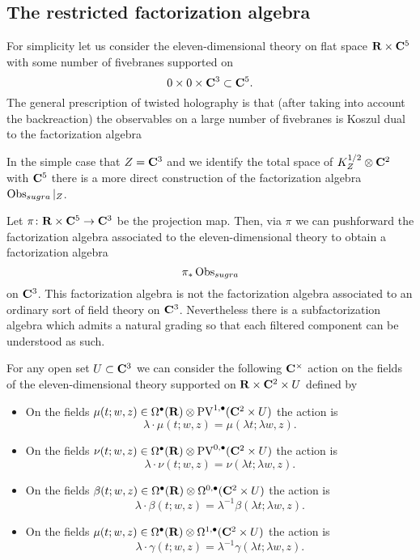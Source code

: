 \subsection{The restricted factorization algebra}

For simplicity let us consider the eleven-dimensional theory on flat space $\mathbf{R} \times \mathbf{C}^5$ with some number of fivebranes supported on
\[
0 \times 0 \times \mathbf{C}^3 \subset \mathbf{C}^5 .
\]
The general prescription of twisted holography is that (after taking into account the backreaction) the observables on a large number of fivebranes is Koszul dual to the factorization algebra 

\parsec[s:flat]

%

In the simple case that $Z = \mathbf{C}^3$ and we identify the total space of $K^{1/2}_Z \otimes \mathbf{C}^2$ with $\mathbf{C}^5$ there is a more direct construction of the factorization algebra $\operatorname{Obs}_{sugra}|_{Z}$. 

Let $\pi \colon \mathbf{R} \times \mathbf{C}^5 \to \mathbf{C}^3$ be the projection map.
Then, via $\pi$ we can pushforward the factorization algebra associated to the eleven-dimensional theory to obtain a factorization algebra
\[
\pi_* \operatorname{Obs}_{sugra} 
\]
on $\mathbf{C}^3$.
This factorization algebra is not the factorization algebra associated to an ordinary sort of field theory on $\mathbf{C}^3$. 
Nevertheless there is a subfactorization algebra which admits a natural grading so that each filtered component can be understood as such.

For any open set $U \subset \mathbf{C}^3$ we can consider the following $\mathbf{C}^\times$ action on the fields of the eleven-dimensional theory supported on $\mathbf{R} \times \mathbf{C}^2 \times U$ defined by
\begin{itemize}
\item On the fields $\mu(t;w,z) \in \Omega^\bullet(\mathbf{R}) \otimes {\rm PV}^{1,\bullet}(\mathbf{C}^2 \times U)$ the action is
\[
\lambda \cdot \mu(t;w,z) = \mu(\lambda t;\lambda w , z).
\]
\item On the fields $\nu(t;w,z) \in \Omega^\bullet(\mathbf{R}) \otimes {\rm PV}^{0,\bullet}(\mathbf{C}^2 \times U)$ the action is
\[
\lambda \cdot \nu(t;w,z) = \nu(\lambda t;\lambda w , z).
\]
\item On the fields $\beta(t;w,z) \in \Omega^\bullet(\mathbf{R}) \otimes \Omega^{0,\bullet}(\mathbf{C}^2 \times U)$ the action is
\[
\lambda \cdot \beta(t;w,z) = \lambda^{-1} \beta(\lambda t;\lambda w , z).
\]
\item On the fields $\mu(t;w,z) \in \Omega^\bullet(\mathbf{R}) \otimes \Omega^{1,\bullet}(\mathbf{C}^2 \times U)$ the action is
\[
\lambda \cdot \gamma(t;w,z) = \lambda^{-1} \gamma(\lambda t;\lambda w , z).
\]
\end{itemize}


